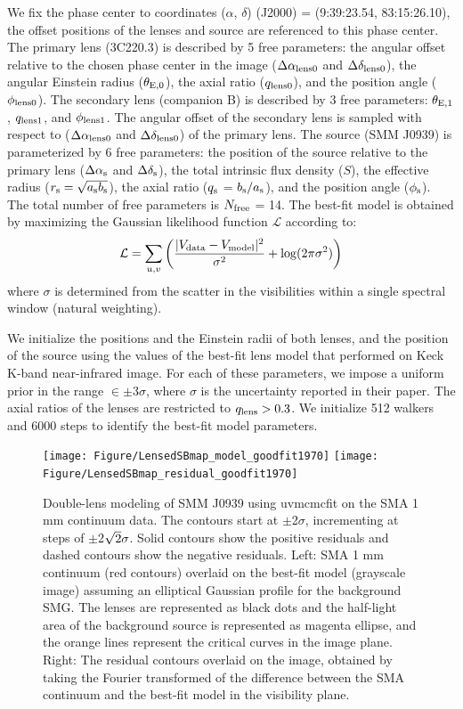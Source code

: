 \documentclass[twocolumn,apj,numberedappendix]{emulateapj}
\begin{document}
We fix the phase center to coordinates ($\alpha$, $\delta$) (J2000) = (9:39:23.54, 83:15:26.10), the
offset positions of the lenses and source are referenced to this phase center. The primary lens (3C220.3) is
described by 5 free parameters: the angular offset relative to
the chosen phase center in the image ($\Delta \alpha_{\rm
lens0}$ and $\Delta \delta_{\rm lens0}$), the angular Einstein radius ($\theta_{\rm E,0}$), the
axial ratio ($q_{\rm lens0}$), and the position angle ($\phi_{\rm lens0}$). The secondary lens (companion B) is
described by 3 free parameters: $\theta_{\rm E,1}$, $q_{\rm lens1}$, and $\phi_{\rm lens1}$. The angular offset
of the secondary
lens is sampled with respect to ($\Delta \alpha_{\rm lens0}$ and $\Delta \delta_{\rm lens0}$) of
the primary lens.
The source (SMM J0939) is parameterized by
6 free parameters: the position of the source relative to the
primary lens ($\Delta \alpha_{\rm s}$ and $\Delta
\delta_{\rm s}$), the total intrinsic flux density ($S$), the
effective radius ($r_{\rm s} = \sqrt{a_{\rm s} b_{\rm s}}$), the axial
ratio ($q_{\rm s}$ =  $b_{\rm s}/a_{\rm s}$), and the position angle
($\phi_{\rm s}$).
The total number of free parameters is $N_{\rm free}$ = 14. The best-fit model is obtained by maximizing the
Gaussian likelihood function $ \mathcal{L} $ according to:
\begin{equation}
    \mathcal{L} = \sum_{u, v}\left( \frac{|V_{\rm data} - V_{\rm
    model}|^2}{\sigma^2} + {\rm log}(2 \pi \sigma^2) \right)
\end{equation}
\noindent where $\sigma$ is determined from the scatter in the visibilities within a
single spectral window (natural weighting).

We initialize the positions and the Einstein radii of both lenses, and the position of the source using the
values of the best-fit lens model that \citet{Haas14} performed on Keck K-band near-infrared image. For each of
these parameters, we impose a uniform prior in the range $\in\pm$3$\sigma$, where $\sigma$ is the uncertainty
reported in their paper. The axial ratios of the lenses are restricted to $q_{\rm lens} > 0.3$. We initialize 512
walkers and 6000 steps to identify the best-fit model parameters.
\begin{figure}[!tbpH]
\centering
\texttt{[image: Figure/LensedSBmap\_model\_goodfit1970]}
\texttt{[image: Figure/LensedSBmap\_residual\_goodfit1970]}
\caption{Double-lens modeling of SMM J0939 using {\sc uvmcmcfit} on the SMA 1 mm continuum data.
The contours start at $\pm$2$\sigma$, incrementing at
steps of $\pm$2$\sqrt{\rm 2}\sigma$. Solid contours show the positive residuals and dashed contours
show the negative residuals. 
Left: SMA 1 mm continuum (red contours) overlaid on the best-fit model (grayscale image) assuming an elliptical Gaussian profile for the background SMG. The lenses are represented as black dots and the half-light area of the background source is represented as magenta ellipse, and the orange lines represent the critical curves in the image plane. 
Right: The residual contours overlaid on the image, obtained by taking the Fourier transformed of the difference between the SMA continuum and the best-fit model in the visibility plane. \label{fig:lens}}
\end{figure}
\end{document}
